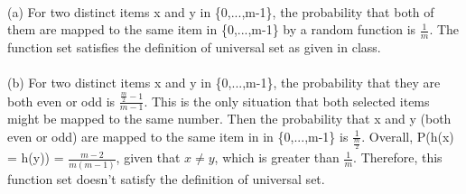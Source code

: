 \begin{problem}{4} ~\\
(a) For two distinct items x and y in \{0,...,m-1\}, the probability that both of them are mapped to the same item in \{0,...,m-1\} by a random function is $\frac{1}{m}$. The function set satisfies the definition of universal set as given in class.\\
\\
(b) For two distinct items x and y in \{0,...,m-1\}, the probability that they are both even or odd is $\frac{\frac{m}{2}-1}{m-1}$. This is the only situation that both selected items might be mapped to the same number. Then the probability that x and y (both even or odd) are mapped to the same item in in \{0,...,m-1\} is $\frac{1}{\frac{m}{2}}$. Overall, P(h(x) = h(y)) = $\frac{m-2}{m(m-1)}$, given that $x \neq y$, which is greater than $\frac{1}{m}$. Therefore, this function set doesn't satisfy the definition of universal set.
\end{problem}